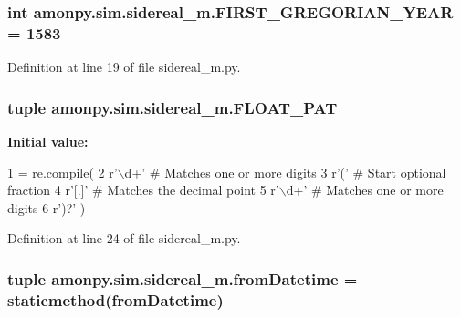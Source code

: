 \hypertarget{namespaceamonpy_1_1sim_1_1sidereal__m_a11c19f5fb22cb192b8cd48a9ad3f5b0e}{
\subsubsection[{F\-I\-R\-S\-T\-\_\-\-G\-R\-E\-G\-O\-R\-I\-A\-N\-\_\-\-Y\-E\-A\-R}]{\setlength{\rightskip}{0pt plus 5cm}int amonpy.\-sim.\-sidereal\-\_\-m.\-F\-I\-R\-S\-T\-\_\-\-G\-R\-E\-G\-O\-R\-I\-A\-N\-\_\-\-Y\-E\-A\-R = 1583}}\label{namespaceamonpy_1_1sim_1_1sidereal__m_a11c19f5fb22cb192b8cd48a9ad3f5b0e}


Definition at line 19 of file sidereal\-\_\-m.\-py.

\hypertarget{namespaceamonpy_1_1sim_1_1sidereal__m_a3ca443ece574fa126427d995a5992be8}{
\subsubsection[{F\-L\-O\-A\-T\-\_\-\-P\-A\-T}]{\setlength{\rightskip}{0pt plus 5cm}tuple amonpy.\-sim.\-sidereal\-\_\-m.\-F\-L\-O\-A\-T\-\_\-\-P\-A\-T}}\label{namespaceamonpy_1_1sim_1_1sidereal__m_a3ca443ece574fa126427d995a5992be8}
{\bfseries Initial value\-:}
\begin{DoxyCode}
1 = re.compile(
2     \textcolor{stringliteral}{r'\(\backslash\)d+'}          \textcolor{comment}{# Matches one or more digits}
3     \textcolor{stringliteral}{r'('}            \textcolor{comment}{# Start optional fraction}
4       \textcolor{stringliteral}{r'[.]'}          \textcolor{comment}{# Matches the decimal point}
5       \textcolor{stringliteral}{r'\(\backslash\)d+'}          \textcolor{comment}{# Matches one or more digits}
6     \textcolor{stringliteral}{r')?'} )
\end{DoxyCode}


Definition at line 24 of file sidereal\-\_\-m.\-py.

\hypertarget{namespaceamonpy_1_1sim_1_1sidereal__m_ac885ba22bff0d27084aaf4aede91e5bc}{
\subsubsection[{from\-Datetime}]{\setlength{\rightskip}{0pt plus 5cm}tuple amonpy.\-sim.\-sidereal\-\_\-m.\-from\-Datetime = staticmethod(from\-Datetime)}}\label{namespaceamonpy_1_1sim_1_1sidereal__m_ac885ba22bff0d27084aaf4aede91e5bc}



